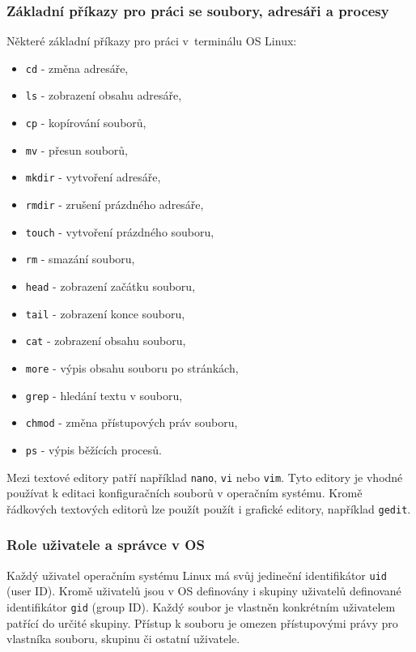 \subsubsection{Základní příkazy pro práci se soubory, adresáři a procesy}
Některé základní příkazy pro práci v~terminálu OS Linux:
\begin{itemize}
  \item \texttt{cd} - změna adresáře,
  \item \texttt{ls} - zobrazení obsahu adresáře,
  \item \texttt{cp} - kopírování souborů,
  \item \texttt{mv} - přesun souborů,
  \item \texttt{mkdir} - vytvoření adresáře,
  \item \texttt{rmdir} - zrušení prázdného adresáře,
  \item \texttt{touch} - vytvoření prázdného souboru,
  \item \texttt{rm} - smazání souboru,
  \item \texttt{head} - zobrazení začátku souboru,
  \item \texttt{tail} - zobrazení konce souboru,
  \item \texttt{cat} - zobrazení obsahu souboru,
  \item \texttt{more} - výpis obsahu souboru po stránkách,
  \item \texttt{grep} - hledání textu v souboru,
  \item \texttt{chmod} - změna přístupových práv souboru,
  \item \texttt{ps} - výpis běžících procesů.
\end{itemize}

Mezi textové editory patří například \texttt{nano}, {\tt vi} nebo \texttt{vim}. Tyto editory je vhodné používat k editaci konfiguračních souborů v operačním systému. Kromě řádkových textových editorů lze použít použít i grafické editory, například \texttt{gedit}.

\subsubsection{Role uživatele a správce v OS}
Každý uživatel operačním systému Linux má svůj jedineční identifikátor \texttt{uid} (user ID). Kromě uživatelů jsou v OS definovány i skupiny uživatelů definované identifikátor {\tt gid} (group ID). Každý soubor je vlastněn konkrétním uživatelem patřící do určité skupiny. Přístup k souboru je omezen přístupovými právy pro vlastníka souboru, skupinu či ostatní uživatele. 

